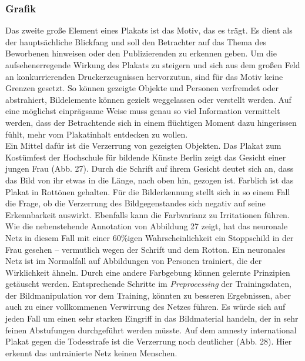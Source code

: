 \documentclass[a4paper,12pt,ngerman]{article}
\begin{document}
\subsubsection{Grafik}
Das zweite große Element eines Plakats ist das Motiv, das es trägt. Es dient als der hauptsächliche Blickfang und soll den Betrachter auf das Thema des Beworbenen hinweisen oder den Publizierenden zu erkennen geben. Um die aufsehenerregende Wirkung des Plakats zu steigern und sich aus dem großen Feld an konkurrierenden Druckerzeugnissen hervorzutun, sind für das Motiv keine Grenzen gesetzt. So können gezeigte Objekte und Personen verfremdet oder abstrahiert, Bildelemente können gezielt weggelassen oder verstellt werden. Auf eine möglichst einprägsame Weise muss genau so viel Information vermittelt werden, dass der Betrachtende sich in einem flüchtigen Moment dazu hingerissen fühlt, mehr vom Plakatinhalt entdecken zu wollen. \\
Ein Mittel dafür ist die Verzerrung von gezeigten Objekten. Das Plakat zum Kostümfest der Hochschule für bildende Künste Berlin zeigt das Gesicht einer jungen Frau (Abb. 27). Durch die Schrift auf ihrem Gesicht deutet sich an, dass das Bild von ihr etwas in die Länge, nach oben hin, gezogen ist. Farblich ist das Plakat in Rottönen gehalten. Für die Bilderkennung stellt sich in so einem Fall die Frage, ob die Verzerrung des Bildgegenstandes sich negativ auf seine Erkennbarkeit auswirkt. Ebenfalls kann die Farbvarianz zu Irritationen führen. Wie die nebenstehende Annotation von Abbildung 27 zeigt, hat das neuronale Netz in diesem Fall mit einer 60\%igen Wahrscheinlichkeit ein Stoppschild in der Frau gesehen – vermutlich wegen der Schrift und dem Rotton. Ein neuronales Netz ist im Normalfall auf Abbildungen von Personen trainiert, die der Wirklichkeit ähneln. Durch eine andere Farbgebung können gelernte Prinzipien getäuscht werden. Entsprechende Schritte im \textit{Preprocessing} der Trainingsdaten, der Bildmanipulation vor dem Training, könnten zu besseren Ergebnissen, aber auch zu einer vollkommenen Verwirrung des Netzes führen. Es würde sich auf jeden Fall um einen sehr starken Eingriff in das Bildmaterial handeln, der in sehr feinen Abstufungen durchgeführt werden müsste. Auf dem amnesty international Plakat gegen die Todesstrafe ist die Verzerrung noch deutlicher (Abb. 28). Hier erkennt das untrainierte Netz keinen Menschen. \\
\end{document}
